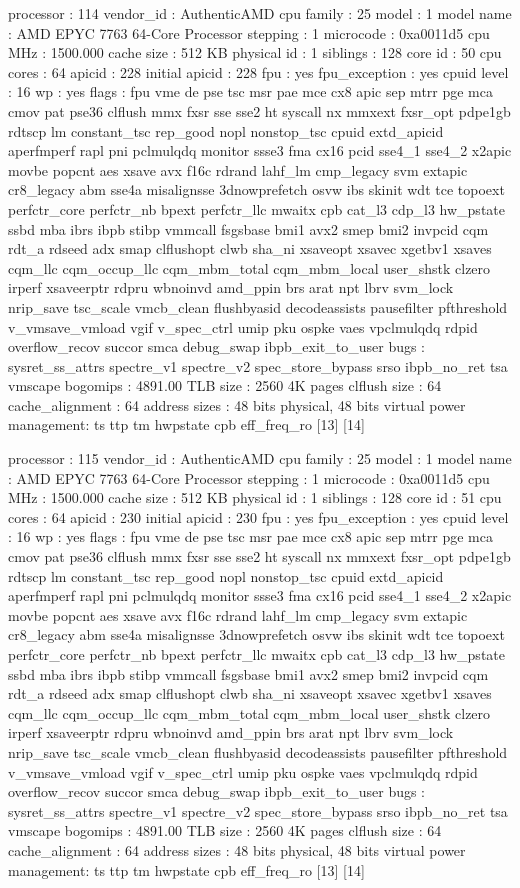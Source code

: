 processor	: 114
vendor_id	: AuthenticAMD
cpu family	: 25
model		: 1
model name	: AMD EPYC 7763 64-Core Processor
stepping	: 1
microcode	: 0xa0011d5
cpu MHz		: 1500.000
cache size	: 512 KB
physical id	: 1
siblings	: 128
core id		: 50
cpu cores	: 64
apicid		: 228
initial apicid	: 228
fpu		: yes
fpu_exception	: yes
cpuid level	: 16
wp		: yes
flags		: fpu vme de pse tsc msr pae mce cx8 apic sep mtrr pge mca cmov pat pse36 clflush mmx fxsr sse sse2 ht syscall nx mmxext fxsr_opt pdpe1gb rdtscp lm constant_tsc rep_good nopl nonstop_tsc cpuid extd_apicid aperfmperf rapl pni pclmulqdq monitor ssse3 fma cx16 pcid sse4_1 sse4_2 x2apic movbe popcnt aes xsave avx f16c rdrand lahf_lm cmp_legacy svm extapic cr8_legacy abm sse4a misalignsse 3dnowprefetch osvw ibs skinit wdt tce topoext perfctr_core perfctr_nb bpext perfctr_llc mwaitx cpb cat_l3 cdp_l3 hw_pstate ssbd mba ibrs ibpb stibp vmmcall fsgsbase bmi1 avx2 smep bmi2 invpcid cqm rdt_a rdseed adx smap clflushopt clwb sha_ni xsaveopt xsavec xgetbv1 xsaves cqm_llc cqm_occup_llc cqm_mbm_total cqm_mbm_local user_shstk clzero irperf xsaveerptr rdpru wbnoinvd amd_ppin brs arat npt lbrv svm_lock nrip_save tsc_scale vmcb_clean flushbyasid decodeassists pausefilter pfthreshold v_vmsave_vmload vgif v_spec_ctrl umip pku ospke vaes vpclmulqdq rdpid overflow_recov succor smca debug_swap ibpb_exit_to_user
bugs		: sysret_ss_attrs spectre_v1 spectre_v2 spec_store_bypass srso ibpb_no_ret tsa vmscape
bogomips	: 4891.00
TLB size	: 2560 4K pages
clflush size	: 64
cache_alignment	: 64
address sizes	: 48 bits physical, 48 bits virtual
power management: ts ttp tm hwpstate cpb eff_freq_ro [13] [14]

processor	: 115
vendor_id	: AuthenticAMD
cpu family	: 25
model		: 1
model name	: AMD EPYC 7763 64-Core Processor
stepping	: 1
microcode	: 0xa0011d5
cpu MHz		: 1500.000
cache size	: 512 KB
physical id	: 1
siblings	: 128
core id		: 51
cpu cores	: 64
apicid		: 230
initial apicid	: 230
fpu		: yes
fpu_exception	: yes
cpuid level	: 16
wp		: yes
flags		: fpu vme de pse tsc msr pae mce cx8 apic sep mtrr pge mca cmov pat pse36 clflush mmx fxsr sse sse2 ht syscall nx mmxext fxsr_opt pdpe1gb rdtscp lm constant_tsc rep_good nopl nonstop_tsc cpuid extd_apicid aperfmperf rapl pni pclmulqdq monitor ssse3 fma cx16 pcid sse4_1 sse4_2 x2apic movbe popcnt aes xsave avx f16c rdrand lahf_lm cmp_legacy svm extapic cr8_legacy abm sse4a misalignsse 3dnowprefetch osvw ibs skinit wdt tce topoext perfctr_core perfctr_nb bpext perfctr_llc mwaitx cpb cat_l3 cdp_l3 hw_pstate ssbd mba ibrs ibpb stibp vmmcall fsgsbase bmi1 avx2 smep bmi2 invpcid cqm rdt_a rdseed adx smap clflushopt clwb sha_ni xsaveopt xsavec xgetbv1 xsaves cqm_llc cqm_occup_llc cqm_mbm_total cqm_mbm_local user_shstk clzero irperf xsaveerptr rdpru wbnoinvd amd_ppin brs arat npt lbrv svm_lock nrip_save tsc_scale vmcb_clean flushbyasid decodeassists pausefilter pfthreshold v_vmsave_vmload vgif v_spec_ctrl umip pku ospke vaes vpclmulqdq rdpid overflow_recov succor smca debug_swap ibpb_exit_to_user
bugs		: sysret_ss_attrs spectre_v1 spectre_v2 spec_store_bypass srso ibpb_no_ret tsa vmscape
bogomips	: 4891.00
TLB size	: 2560 4K pages
clflush size	: 64
cache_alignment	: 64
address sizes	: 48 bits physical, 48 bits virtual
power management: ts ttp tm hwpstate cpb eff_freq_ro [13] [14]


